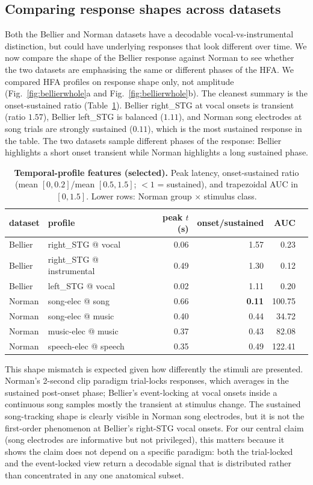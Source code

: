 \documentclass[11pt]{article}
\begin{document}
\subsection{Comparing response shapes across datasets}
Both the Bellier and Norman datasets have a decodable vocal-vs-instrumental distinction, but could have underlying responses that look different over time. We now compare the shape of the Bellier response against Norman to see whether the two datasets are emphasising the same or different phases of the HFA. We compared HFA profiles on response shape only, not amplitude  (Fig.~\ref{fig:bellierwhole}a and Fig.~\ref{fig:bellierwhole}b). The cleanest summary is the onset-sustained ratio (Table~\ref{tab:profiles}). Bellier right\_STG at vocal onsets is transient (ratio $1.57$), Bellier left\_STG is balanced ($1.11$), and Norman \textsf{song} electrodes at song trials are strongly sustained ($0.11$), which is the most sustained response in the table. The two datasets sample different phases of the response: Bellier highlights a short onset transient while Norman highlights a long sustained phase.

\begin{table}[h]
\centering\small
\caption{\textbf{Temporal-profile features (selected).} Peak latency, onset-sustained ratio (mean $[0,0.2]$/mean $[0.5,1.5]$; $< 1$ = sustained), and trapezoidal AUC in $[0,1.5]$. Lower rows: Norman group $\times$ stimulus class.}
\label{tab:profiles}
\begin{tabular}{llrrrr}
\toprule
dataset & profile & peak $t$ (s) & onset/sustained & AUC \\
\midrule
Bellier & right\_STG @ vocal        & 0.06 & 1.57 & 0.23 \\
Bellier & right\_STG @ instrumental & 0.49 & 1.30 & 0.12 \\
Bellier & left\_STG  @ vocal        & 0.02 & 1.11 & 0.20 \\
Norman  & song-elec  @ song         & 0.66 & \textbf{0.11} & 100.75 \\
Norman  & song-elec  @ music        & 0.40 & 0.44 & 34.72 \\
Norman  & music-elec @ music        & 0.37 & 0.43 & 82.08 \\
Norman  & speech-elec @ speech      & 0.35 & 0.49 & 122.41 \\
\bottomrule
\end{tabular}
\end{table}

This shape mismatch is expected given how differently the stimuli are presented. Norman's 2-second clip paradigm trial-locks responses, which averages in the sustained post-onset phase; Bellier's event-locking at vocal onsets inside a continuous song samples mostly the transient at stimulus change. The sustained song-tracking shape is clearly visible in Norman song electrodes, but it is not the first-order phenomenon at Bellier's right-STG vocal onsets. For our central claim (song electrodes are informative but not privileged), this matters because it shows the claim does not depend on a specific paradigm: both the trial-locked and the event-locked view return a decodable signal that is distributed rather than concentrated in any one anatomical subset.
\end{document}
